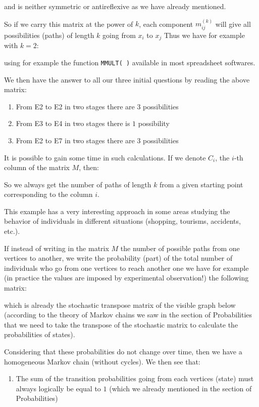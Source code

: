 {	and is neither symmetric or antireflexive as we have already mentioned.
	
	So if we carry this matrix at the power of $k$, each component $m_{ij}^{(k)}$ will give all possibilities (paths) of length $k$ going from $x_i$ to $x_j$ Thus we have for example with $k=2$:
	
	using for example the function \texttt{MMULT( )} available in most spreadsheet softwares.
	
	We then have the answer to all our three initial questions by reading the above matrix:
	\begin{enumerate}
		\item From E2 to E2 in two stages there are $3$ possibilities

		\item  From E3 to E4 in two stages there is $1$ possibility

		\item From E2 to E7 in two stages there are $3$ possibilities
	\end{enumerate}
	It is possible to gain some time in such calculations. If we denote $C_i$, the $i$-th column of the matrix $M$, then:
	
	So we always get the number of paths of length $k$ from a given starting point corresponding to the column $i$.
	
	This example has a very interesting approach in some areas studying the behavior of individuals in different situations (shopping, tourisms, accidents, etc.).
	
	If instead of writing in the matrix $M$ the number of possible paths from one vertices to another, we write the probability (part) of the total number of individuals who go from one vertices to reach another one we have for example (in practice the values are imposed by experimental observation!) the following matrix:
	
	which is already the stochastic transpose  matrix of the visible graph below (according to the theory of Markov chains we saw in the section of Probabilities that we need to take the transpose of the stochastic matrix to calculate the probabilities of states).
	
	Considering that these probabilities do not change over time, then we have a homogeneous Markov chain (without cycles). We then see that:
	\begin{enumerate}
		\item The sum of the transition probabilities going from each vertices (state) must always logically be equal to $1$ (which we already mentioned in the section of Probabilities)


\end{enumerate}}
